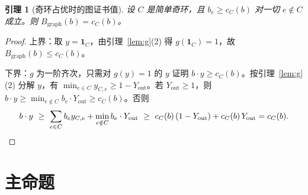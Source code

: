 \documentclass[11pt,a4paper]{article}
\newtheorem{lemma}[theorem]{引理}
\theoremstyle{definition}
\newcommand{\Bg}{B_{\mathrm{graph}}}
\begin{document}
\begin{lemma}[奇环占优时的图证书值]\label{lem:cycle}
设 $C$ 是简单奇环，且 $b_e\ge c_C(b)$ 对一切 $e\notin C$ 成立。则 $\Bg(b)=c_C(b)$。
\end{lemma}
\begin{proof}
上界：取 $y=\mathbf 1_C$，由引理~\ref{lem:g}(2) 得 $g(\mathbf1_C)=1$，故 $\Bg(b)\le c_C(b)$。

下界：$g$ 为一阶齐次，只需对 $g(y)=1$ 的 $y$ 证明 $b\cdot y\ge c_C(b)$。按引理~\ref{lem:g}(2) 分解 $y$，有 $\min_{e\in C}y_{C,e}\ge1-Y_{\mathrm{out}}$。若 $Y_{\mathrm{out}}\ge1$，则 $b\cdot y\ge\min_{e\notin C}b_e\cdot Y_{\mathrm{out}}\ge c_C(b)$。否则
\[
b\cdot y\ \ge\ \sum_{e\in C}b_ey_{C,e}+\min_{e\notin C}b_e\cdot Y_{\mathrm{out}}
\ \ge\ c_C(b)\,(1-Y_{\mathrm{out}})+c_C(b)\,Y_{\mathrm{out}}=c_C(b).\qedhere
\]
\end{proof}

\section{主命题}
\end{document}
